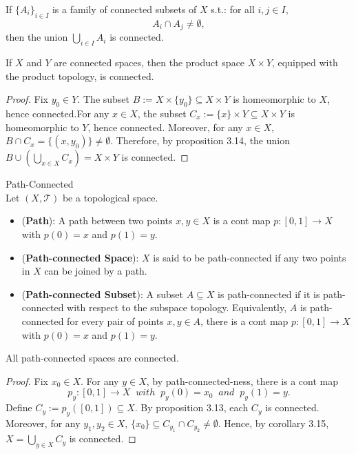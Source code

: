 \begin{corollary}
    If $\{A_i\}_{i\in I}$ is a family of connected subsets of $X$ s.t.: for all $i,j \in I$,
    $$A_i \cap A_j \neq \emptyset,$$
    then the union $\bigcup_{i \in I}A_i$ is connected.
\end{corollary}

\begin{proposition}
    If $X$ and $Y$ are connected spaces, then the product space $X \times Y$, equipped with the product topology, is connected.
\end{proposition}

\begin{proof}
    Fix $y_0 \in Y$. The subset $B:= X\times \{y_0\} \subseteq X\times Y$ is homeomorphic to $X$, hence connected.For any $x \in X$, the subset $C_x := \{x\} \times Y \subseteq X\times Y$ is homeomorphic to $Y$, hence connected. Moreover, for any $x\in X$, $B \cap C_x =\{(x,y_0)\} \neq \emptyset$. Therefore, by proposition 3.14, the union $B \cup (\bigcup_{x \in X} C_x) = X\times Y$ is connected.
\end{proof}

\begin{definition}{Path-Connected}\\
Let $(X,\mathcal{T})$ be a topological space.
\begin{itemize}
    \item (\textbf{Path}): A path between two points $x,y \in X$ is a cont map $p: [0,1] \rightarrow X$ with $p(0) =x$ and $p(1)=y$.
    \item (\textbf{Path-connected Space}): $X$ is said to be path-connected if any two points in $X$ can be joined by a path.
    \item (\textbf{Path-connected Subset}): A subset $A \subseteq X$ is path-connected if it is path-connected with respect to the subspace topology. Equivalently, $A$ is path-connected for every pair of points $x,y \in A$, there is a cont map $p: [0,1] \rightarrow X$ with $p(0) =x$ and $p(1)=y$.
\end{itemize}
\end{definition}

\begin{proposition}
    All path-connected spaces are connected.
\end{proposition}

\begin{proof}
    Fix $x_0 \in X$. For any $y \in X$, by path-connected-ness, there is a cont map
    $$p_y : [0,1] \rightarrow X \;\; with \;\; p_y (0)=x_0 \;\; and\;\; p_y(1) = y.$$
    Define $C_y := p_y([0,1]) \subseteq X$. By proposition 3.13, each $C_y$ is connected. Moreover, for any $y_1,y_2\in X$, $\{x_0\} \subseteq C_{y_1} \cap C_{y_2} \neq \emptyset$. Hence, by corollary 3.15, $X = \bigcup_{y\in X} C_y$ is connected.
\end{proof}

